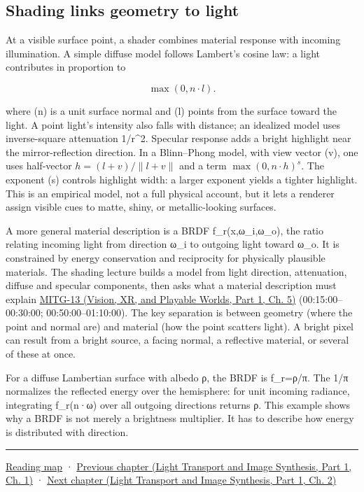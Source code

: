 \subsection{Shading links geometry to light}\label{03-visual-computing-i-ch006-shading-links-geometry-to-light}

\hypertarget{03-visual-computing-i-ch006-shading-links-geometry-to-light}{}

At a visible surface point, a shader combines material response with incoming illumination. A simple diffuse model follows Lambert's cosine law: a light contributes in proportion to

\[
\max(0,n\cdot l).
\]

where (n) is a unit surface normal and (l) points from the surface toward the light. A point light's intensity also falls with distance; an idealized model uses inverse-square attenuation 1/r\^{}2. Specular response adds a bright highlight near the mirror-reflection direction. In a Blinn--Phong model, with view vector (v), one uses half-vector \(h=(l+v)/\|l+v\|\) and a term \(\max(0,n\cdot h)^s\). The exponent (s) controls highlight width: a larger exponent yields a tighter highlight. This is an empirical model, not a full physical account, but it lets a renderer assign visible cues to matte, shiny, or metallic-looking surfaces.

A more general material description is a BRDF f\_r(x,ω\_i,ω\_o), the ratio relating incoming light from direction ω\_i to outgoing light toward ω\_o. It is constrained by energy conservation and reciprocity for physically plausible materials. The shading lecture builds a model from light direction, attenuation, diffuse and specular components, then asks what a material description must explain \href{../07-Vision-XR-and-Playable-Worlds-P01/main.pdf\#04-visual-computing-ii-ch036-mitg-13---shading}{MITG-13 (Vision, XR, and Playable Worlds, Part 1, Ch. 5)} (00:15:00--00:30:00; 00:50:00--01:10:00). The key separation is between geometry (where the point and normal are) and material (how the point scatters light). A bright pixel can result from a bright source, a facing normal, a reflective material, or several of these at once.

For a diffuse Lambertian surface with albedo ρ, the BRDF is f\_r=ρ/π. The 1/π normalizes the reflected energy over the hemisphere: for unit incoming radiance, integrating f\_r(n·ω) over all outgoing directions returns ρ. This example shows why a BRDF is not merely a brightness multiplier. It has to describe how energy is distributed with direction.

\begin{center}\rule{0.5\linewidth}{0.5pt}\end{center}

\hyperref[volume-reading-map]{Reading map} · \href{../04-Light-Transport-and-Image-Synthesis-P01/main.pdf\#03-visual-computing-i-ch005-reflectance-materials-and-light-transport}{Previous chapter (Light Transport and Image Synthesis, Part 1, Ch. 1)} · \href{../04-Light-Transport-and-Image-Synthesis-P01/main.pdf\#03-visual-computing-i-ch007-the-rendering-equation-and-path-probabilities}{Next chapter (Light Transport and Image Synthesis, Part 1, Ch. 2)}
